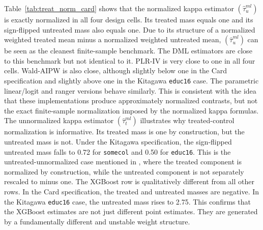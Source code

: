 \documentclass[12pt, a4paper, oneside]{article}
\theoremstyle{plain}
\theoremstyle{definition}
\begin{document}
Table~\ref{tab:treat_norm_card} shows that the normalized kappa estimator $(\hat{\tau}^{ml}_{u})$ is exactly normalized in all four design cells.
Its treated mass equals one and its sign-flipped untreated mass also equals one. Due to its structure of a normalized weighted treated mean minus a normalized weighted untreated mean, $(\hat{\tau}^{ml}_{u})$ can be seen as the cleanest finite-sample benchmark.
The DML estimators are close to this benchmark but not identical to it. PLR-IV is very close to one in all four cells. Wald-AIPW is also close, although slightly below one in the Card specification and slightly above one in the Kitagawa \texttt{educ16} case. The parametric linear/logit and ranger versions behave similarly. This is consistent with the idea that these implementations produce approximately normalized contrasts, but not the exact finite-sample normalization imposed by the normalized kappa formulas.
The unnormalized kappa estimator $(\hat{\tau}^{ml}_{t})$ illustrates why treated-control normalization is informative. Its treated mass is one by construction, but the untreated mass is not.
Under the Kitagawa specification, the sign-flipped untreated mass falls to 0.72 for \texttt{somecol} and 0.50 for \texttt{educ16}. This is the untreated-unnormalized case mentioned in \citet{knaus2024treatment}, where the treated component is normalized by construction, while the untreated component is not separately rescaled to minus one.
The XGBoost row is qualitatively different from all other rows. In the Card specification, the treated and untreated masses are negative. In the Kitagawa \texttt{educ16} case, the untreated mass rises to 2.75. This confirms that the XGBoost estimates are not just different point estimates. They are generated by a fundamentally different and unstable weight structure.
\end{document}
